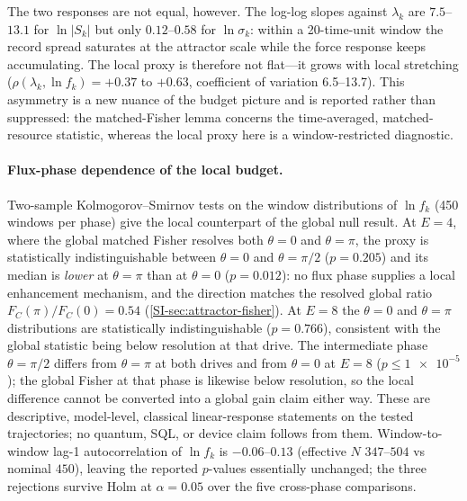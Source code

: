 \documentclass[preprint,numbers,a4paper]{elsarticle}
\begin{document}
The two responses are not equal, however. The log-log slopes against $\lambda_{k}$ are $7.5$--$13.1$ for $\ln|S_{k}|$ but only $0.12$--$0.58$ for $\ln\sigma_{k}$: within a \num{20}-time-unit window the record spread saturates at the attractor scale while the force response keeps accumulating. The local proxy is therefore not flat---it grows with local stretching ($\rho(\lambda_{k},\ln f_{k})=+0.37$ to $+0.63$, coefficient of variation \num{6.5}--\num{13.7}). This asymmetry is a new nuance of the budget picture and is reported rather than suppressed: the matched-Fisher lemma concerns the time-averaged, matched-resource statistic, whereas the local proxy here is a window-restricted diagnostic.

\paragraph{Flux-phase dependence of the local budget.}
Two-sample Kolmogorov--Smirnov tests on the window distributions of $\ln f_{k}$ (\num{450} windows per phase) give the local counterpart of the global null result. At $E=\num{4}$, where the global matched Fisher resolves both $\theta=0$ and $\theta=\pi$, the proxy is statistically indistinguishable between $\theta=0$ and $\theta=\pi/2$ ($p=0.205$) and its median is \emph{lower} at $\theta=\pi$ than at $\theta=0$ ($p=0.012$): no flux phase supplies a local enhancement mechanism, and the direction matches the resolved global ratio $F_C(\pi)/F_C(0)=0.54$ (\cref{SI-sec:attractor-fisher}). At $E=\num{8}$ the $\theta=0$ and $\theta=\pi$ distributions are statistically indistinguishable ($p=0.766$), consistent with the global statistic being below resolution at that drive. The intermediate phase $\theta=\pi/2$ differs from $\theta=\pi$ at both drives and from $\theta=0$ at $E=\num{8}$ ($p\le\num{1e-5}$); the global Fisher at that phase is likewise below resolution, so the local difference cannot be converted into a global gain claim either way. These are descriptive, model-level, classical linear-response statements on the tested trajectories; no quantum, SQL, or device claim follows from them. Window-to-window lag-1 autocorrelation of $\ln f_k$ is $\num{-0.06}$--$\num{+0.13}$ (effective $N$ $\num{347}$--$\num{504}$ vs nominal $\num{450}$), leaving the reported $p$-values essentially unchanged; the three rejections survive Holm at $\alpha=\num{0.05}$ over the five cross-phase comparisons.
\end{document}

